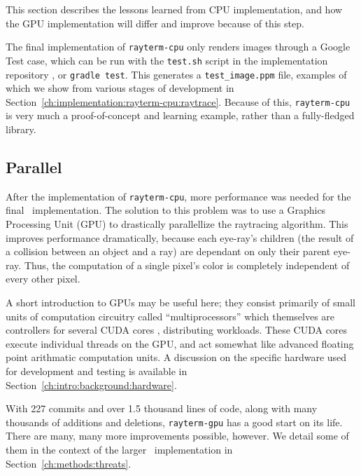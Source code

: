  \label{ch:methods:renderer:sequential:prototype}

This section describes the lessons learned from CPU implementation, and how the GPU implementation will differ and improve because of this step.

The final implementation of \texttt{rayterm-cpu} only renders images through a Google Test \cite{googletest} case, which can be run with the \texttt{test.sh} script in the implementation repository \cite{raytermCpuImpl}, or \texttt{gradle test}.
This generates a \texttt{test\_image.ppm} file, examples of which we show from various stages of development in Section~\ref{ch:implementation:rayterm-cpu:raytrace}.
Because of this, \texttt{rayterm-cpu} is very much a proof-of-concept and learning example, rather than a fully-fledged library.

\subsection{Parallel} \label{ch:methods:renderer:parallel}

After the implementation of \texttt{rayterm-cpu}, more performance was needed for the final \name\ implementation.
The solution to this problem was to use a Graphics Processing Unit (GPU) to drastically parallellize the raytracing algorithm.
This improves performance dramatically, because each eye-ray's children (the result of a collision between an object and a ray) are dependant on only their parent eye-ray.
Thus, the computation of a single pixel's color is completely independent of every other pixel.

A short introduction to GPUs may be useful here; they consist primarily of small units of computation circuitry called ``multiprocessors'' which themselves are controllers for several CUDA cores \cite{fermi2009nvidia}, distributing workloads.
These CUDA cores execute individual threads on the GPU, and act somewhat like advanced floating point arithmatic computation units.
A discussion on the specific hardware used for development and testing is available in Section~\ref{ch:intro:background:hardware}.

With 227 commits and over 1.5 thousand lines of code, along with many thousands of additions and deletions, \texttt{rayterm-gpu} has a good start on its life.
There are many, many more improvements possible, however.
We detail some of them in the context of the larger \name\ implementation in Section~\ref{ch:methods:threats}.

